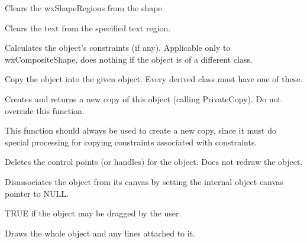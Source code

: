 

Clears the wxShapeRegions from the shape.



Clears the text from the specified text region.



Calculates the object's constraints (if any). Applicable
only to wxCompositeShape, does nothing if the object is of
a different class.



Copy the object into the given object. Every derived class must have one of these.



Creates and returns a new copy of this object (calling PrivateCopy). Do not override this function.

This function should always be used to create a new copy, since it must do special processing
for copying constraints associated with constraints.



Deletes the control points (or handles) for the object. Does not redraw
the object.



Disassociates the object from its canvas by setting the internal object
canvas pointer to NULL.



TRUE if the object may be dragged by the user.



Draws the whole object and any lines attached to it.


